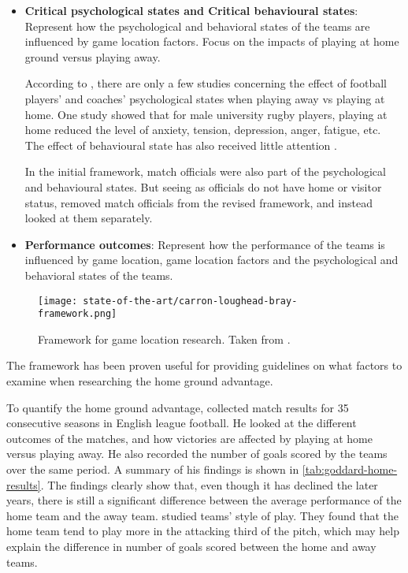 \begin{itemize}
    \item \textbf{Critical psychological states and Critical behavioural states}: Represent how the psychological and behavioral states of the teams are influenced by game location factors. Focus on the impacts of playing at home ground versus playing away.
    
    According to \citet{bib:carron-loughead-bray-2005}, there are only a few studies concerning the effect of football players' and coaches' psychological states when playing away vs playing at home. One study showed that for male university rugby players, playing at home reduced the level of anxiety, tension, depression, anger, fatigue, etc. The effect of behavioural state has also received little attention \citep{bib:carron-loughead-bray-2005}.
    
    In the initial framework, match officials were also part of the psychological and behavioural states. But seeing as officials do not have home or visitor status, \citet{bib:carron-loughead-bray-2005} removed match officials from the revised framework, and instead looked at them separately.
    
    \item \textbf{Performance outcomes}: Represent how the performance of the teams is influenced by game location, game location factors and the psychological and behavioral states of the teams.
\end{itemize}

\begin{figure}
    \centering
    \texttt{[image: state-of-the-art/carron-loughead-bray-framework.png]}
    \caption{Framework for game location research. Taken from \citet{bib:carron-loughead-bray-2005}.}
    \label{fig:carron-loughead-bray-framework}
\end{figure}

The framework has been proven useful for providing guidelines on what factors to examine when researching the home ground advantage.

To quantify the home ground advantage, \citet{bib:goddard-2006} collected match results for 35 consecutive seasons in English league football. He looked at the different outcomes of the matches, and how victories are affected by playing at home versus playing away. He also recorded the number of goals scored by the teams over the same period. A summary of his findings is shown in \cref{tab:goddard-home-results}. The findings clearly show that, even though it has declined the later years, there is still a significant difference between the average performance of the home team and the away team. \citet{bib:bialkowski-lucey-carr-yue-sridharan-matthews-2014} studied teams' style of play. They found that the home team tend to play more in the attacking third of the pitch, which may help explain the difference in number of goals scored between the home and away teams.

